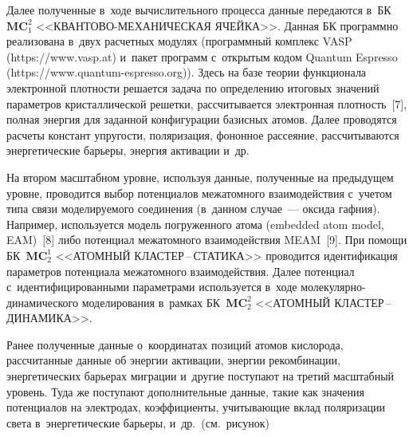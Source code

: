 \begin{multicols}{2}
     Далее полученные в~ходе вычислительного процесса данные передаются 
в~БК $\mathbf{MC}_1^2$ <<КВАН\-ТО\-ВО-МЕ\-ХА\-НИ\-ЧЕ\-СКАЯ 
ЯЧЕЙКА>>. Данная БК программно реализована в~двух 
расчетных модулях (про\-грам\-мный комплекс VASP ({\sf https://www.\linebreak vasp.at}) 
и~пакет программ с~открытым кодом Quantum Espresso 
({\sf https://www.quantum-espresso.org})). Здесь на базе теории функционала электронной плотности решается 
задача по определению итоговых значений параметров кристаллической решетки, 
рассчитывается электронная плотность~[7], полная энергия для заданной 
конфигурации базисных атомов. Далее проводятся расчеты констант упругости, 
поляризация, фононное рассеяние, рассчитываются энергетические барьеры, 
энергия активации и~др.
    
На втором масштабном уровне, используя данные, полученные на предыдущем 
уровне, проводится выбор потенциалов межатомного взаимодействия с~учетом 
типа связи моделируемого \mbox{соединения} (в~данном случае~--- оксида гафния). 
Например, используется модель погруженного атома (embedded atom model, 
EAM)~[8] либо потенциал межатомного взаимодействия MEAM~[9]. При 
помощи БК~$\mathbf{MC}_2^1$ <<АТОМНЫЙ КЛАСТЕР\,--\,СТА\-ТИ\-КА>> 
проводится идентификация параметров потенциала межатомного 
взаимодействия. Далее потенциал с~идентифицированными параметрами 
используется в~ходе мо\-ле\-ку\-ляр\-но-ди\-на\-ми\-че\-ско\-го моделирования 
в~рамках БК~$\mathbf{MC}_2^2$ <<АТОМНЫЙ КЛАС\-ТЕР\,--\,ДИ\-НА\-МИ\-КА>>. 

Ранее полученные данные о~координатах позиций атомов 
кислорода, рассчитанные данные об энергии активации, энергии рекомбинации, 
энергетических барьерах миграции и~другие поступают на третий масштабный 
уровень. Туда же поступают дополнительные данные, такие как значения 
потенциалов на электродах, коэффициенты, учитывающие вклад поляризации 
света в~энергетические барьеры, и~др.\ (см.\ рисунок) 
    

\end{multicols}
